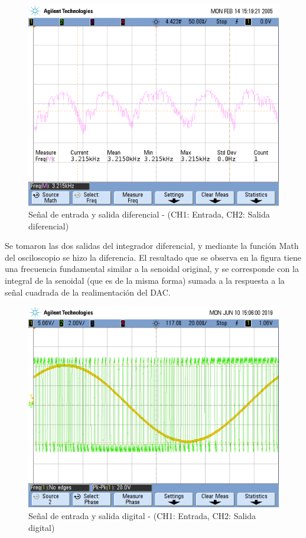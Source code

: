 \documentclass[assd_tp3_main.tex]{subfiles}
\begin{document}
\begin{figure}[!ht]
\begin{centering}
\includegraphics[scale=0.25]{../EJ4/Mediciones/Seno/dif_seno.png}
\par\end{centering}
\caption{Señal de entrada y salida diferencial - (CH1: Entrada, CH2: Salida diferencial)}
\end{figure}

Se tomaron las dos salidas del integrador diferencial, y mediante la función Math del osciloscopio se hizo la diferencia. El resultado que se observa en la figura tiene una frecuencia fundamental similar a la senoidal original, y se corresponde con la integral de la senoidal (que es de la misma forma) sumada a la respuesta a la señal cuadrada de la realimentación del DAC.

\begin{figure}[!ht]
\begin{centering}
\includegraphics[scale=0.25]{../EJ4/Mediciones/Seno/s1_3.png}
\par\end{centering}
\caption{Señal de entrada y salida digital - (CH1: Entrada, CH2: Salida digital)}
\end{figure}
\end{document}
